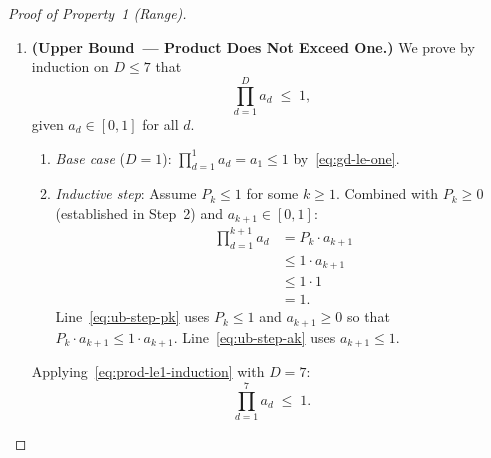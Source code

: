 \documentclass[12pt,openany]{book}
\numberwithin{equation}{chapter}
\theoremstyle{plain}
\theoremstyle{definition}
\theoremstyle{remark}
\begin{document}
\begin{proof}[Proof of Property~1 (Range)]
\begin{enumerate}
  \item \textbf{(Upper Bound~--- Product Does Not Exceed One.)}
        We prove by induction on $D \leq 7$ that
        \begin{equation}
          \prod_{d=1}^{D} a_d \;\leq\; 1,
          \label{eq:prod-le1-induction}
        \end{equation}
        given $a_d \in [0,1]$ for all $d$.
        \begin{enumerate}
          \item \emph{Base case} ($D = 1$):
                $\prod_{d=1}^{1} a_d = a_1 \leq 1$
                by~\eqref{eq:gd-le-one}.
          \item \emph{Inductive step}: Assume
                $P_k \leq 1$ for some $k \geq 1$.
                Combined with $P_k \geq 0$
                (established in Step~2) and
                $a_{k+1} \in [0,1]$:
                \begin{align}
                  \prod_{d=1}^{k+1} a_d
                    &= P_k \cdot a_{k+1}
                    \label{eq:ub-step} \\
                    &\leq 1 \cdot a_{k+1}
                    \label{eq:ub-step-pk} \\
                    &\leq 1 \cdot 1
                    \label{eq:ub-step-ak} \\
                    &= 1.
                    \label{eq:ub-step-one}
                \end{align}
                Line~\eqref{eq:ub-step-pk} uses $P_k \leq 1$
                and $a_{k+1} \geq 0$ so that
                $P_k \cdot a_{k+1} \leq 1 \cdot a_{k+1}$.
                Line~\eqref{eq:ub-step-ak} uses
                $a_{k+1} \leq 1$.
        \end{enumerate}
        Applying~\eqref{eq:prod-le1-induction} with $D=7$:
        \begin{equation}
          \prod_{d=1}^{7} a_d \;\leq\; 1.
          \label{eq:prod-le1}
        \end{equation}


\end{enumerate}
\end{proof}
\end{document}
